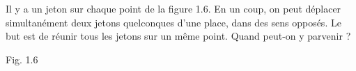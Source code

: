 Il y a un jeton sur chaque point de la figure 1.6. En un coup, on peut déplacer simultanément deux jetons quelconques d'une place, dans des sens opposés. Le but est de réunir tous les jetons sur un même point. Quand peut-on y parvenir ?
\begin{center}

Fig. 1.6
\end{center}

